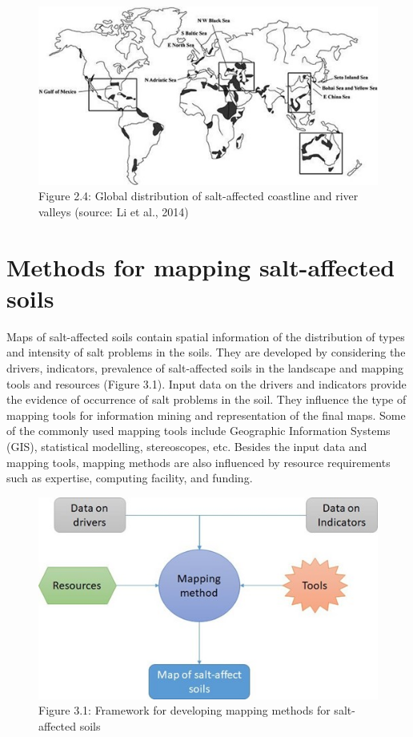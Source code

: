 \documentclass[
  10pt,
  b5paper,
]{book}
\begin{document}
\begin{figure}
\centering
\includegraphics{figures/images/Figure2.4.jpg}
\caption{Figure 2.4: Global distribution of salt-affected coastline and river valleys (source: Li et al., 2014)}
\end{figure}

\hypertarget{methods-for-mapping-salt-affected-soils}{%
\chapter{Methods for mapping salt-affected soils}\label{methods-for-mapping-salt-affected-soils}}

Maps of salt-affected soils contain spatial information of the distribution of types and intensity of salt problems in the soils. They are developed by considering the drivers, indicators, prevalence of salt-affected soils in the landscape and mapping tools and resources (Figure 3.1). Input data on the drivers and indicators provide the evidence of occurrence of salt problems in the soil. They influence the type of mapping tools for information mining and representation of the final maps. Some of the commonly used mapping tools include Geographic Information Systems (GIS), statistical modelling, stereoscopes, etc. Besides the input data and mapping tools, mapping methods are also influenced by resource requirements such as expertise, computing facility, and funding.

\begin{figure}
\centering
\includegraphics{figures/images/Figure3.1.jpg}
\caption{Figure 3.1: Framework for developing mapping methods for salt-affected soils}
\end{figure}
\end{document}
